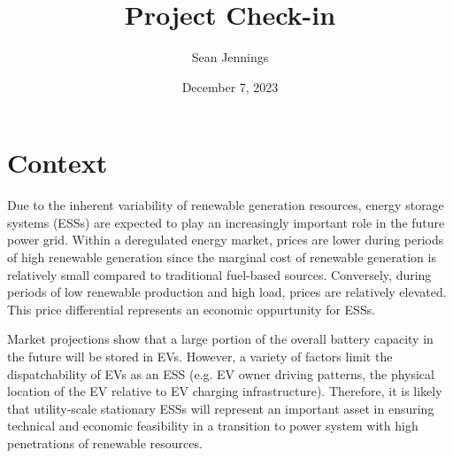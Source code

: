\documentclass{homework}
\title{Project Check-in}
\author{Sean Jennings}
\date{December 7, 2023}
\begin{document}
\maketitle

\section{Context}









Due to the inherent variability of renewable generation resources, 
energy storage systems (ESSs) are expected to play an increasingly important role 
in the future power grid. Within a deregulated energy market, prices are lower
during periods of high renewable generation since the marginal cost of
renewable generation is relatively small compared to traditional fuel-based sources.
Conversely, during periods of low renewable production and high load, prices
are relatively elevated. This price differential represents an economic
oppurtunity for ESSs.

Market projections show that a large portion of the overall battery capacity in the
future will be stored in EVs. However, a variety of factors limit the dispatchability
of EVs as an ESS (e.g. EV owner driving patterns, the physical location of the EV
relative to EV charging infrastructure). Therefore, it is likely that utility-scale
stationary ESSs will represent an important asset in ensuring technical and
economic feasibility in a transition to power system with high penetrations of
renewable resources.
\end{document}
